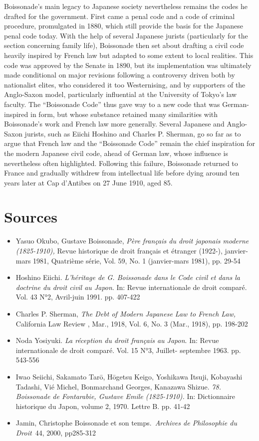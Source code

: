 \documentclass[11pt,a4paper]{article}
\begin{document}
Boissonade's main legacy to Japanese society nevertheless remains the codes he drafted for the government. First came a penal code and a code of criminal procedure, promulgated in 1880, which still provide the basis for the Japanese penal code today. With the help of several Japanese jurists (particularly for the section concerning family life), Boissonade then set about drafting a civil code heavily inspired by French law but adapted to some extent to local realities. This code was approved by the Senate in 1890, but its implementation was ultimately made conditional on major revisions following a controversy driven both by nationalist elites, who considered it too Westernising, and by supporters of the Anglo-Saxon model, particularly influential at the University of Tokyo's law faculty. The ``Boissonade Code'' thus gave way to a new code that was German-inspired in form, but whose substance retained many similarities with Boissonade's work and French law more generally. Several Japanese and Anglo-Saxon jurists, such as Eiichi Hoshino and Charles P. Sherman, go so far as to argue that French law and the ``Boissonade Code'' remain the chief inspiration for the modern Japanese civil code, ahead of German law, whose influence is nevertheless often highlighted. Following this failure, Boissonade returned to France and gradually withdrew from intellectual life before dying around ten years later at Cap d'Antibes on 27 June 1910, aged 85.

\section{Sources}
\small

\begin{itemize}[leftmargin=1.3em,itemsep=.18em,topsep=.25em]
\item
  Yasuo Okubo, Gustave Boissonade, \emph{Père français du droit japonais moderne (1825-1910),} Revue historique de droit français et étranger (1922-), janvier-mars 1981, Quatrième série, Vol. 59, No. 1 (janvier-mars 1981), pp. 29-54
\item
  Hoshino Eiichi. \emph{L’héritage de G. Boissonade dans le Code civil et dans la doctrine du droit civil au Japon}. In: Revue internationale de droit comparé. Vol. 43 N°2, Avril-juin 1991. pp. 407-422
\item
  Charles P. Sherman, \emph{The Debt of Modern Japanese Law to French Law,} California Law Review , Mar., 1918, Vol. 6, No. 3 (Mar., 1918), pp. 198-202
\item
  Noda Yosiyuki. \emph{La réception du droit français au Japon}. In: Revue internationale de droit comparé. Vol. 15 N°3, Juillet- septembre 1963. pp. 543-556
\item
  Iwao Seiichi, Sakamato Tarō, Hōgetsu Keigo, Yoshikawa Itsuji, Kobayashi Tadashi, Vié Michel, Bonmarchand Georges, Kanazawa Shizue. \emph{78. Boissonade de Fontarabie, Gustave Emile (1825-1910).} In: Dictionnaire historique du Japon, volume 2, 1970. Lettre B. pp. 41-42
\item
  Jamin, Christophe Boissonade et son temps.~\emph{Archives de Philosophie du Droit}~44, 2000, pp285-312
\end{itemize}
\end{document}
